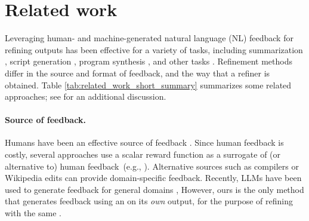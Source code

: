 \section{Related work}
Leveraging human- and machine-generated natural language (NL) feedback for refining outputs has been effective for a variety of tasks, including summarization \cite{scheurerandperez2022training}, script generation \cite{tandon2021interscript}, program synthesis \cite{Le2022CodeRL, Yasunaga2020DrRepair}, 
and other tasks \cite{bai2022rlhf, Schick2022PEERAC, Saunders2022SelfCritique, bai2022constitutional, Welleck2022SelfCorrect}. Refinement methods differ in the source and format of feedback, and the way that a refiner is obtained.
Table \ref{tab:related_work_short_summary} summarizes some related approaches; see  for an additional discussion.



 

\paragraph{Source of feedback.}

Humans have been an effective source of feedback \cite{tandon2021interscript,elgohary2021nl,tandon2022learning,bai2022rlhf}. 
Since human feedback is costly, several approaches
use a scalar reward function as a surrogate of (or alternative to) human feedback~(e.g., \cite{bai2022rlhf, Liu2022RainierRK, Lu2022QuarkCT, Le2022CodeRL, Welleck2022SelfCorrect}).
Alternative sources such as compilers 
\cite{Yasunaga2020DrRepair} or Wikipedia edits \cite{Schick2022PEERAC} can provide domain-specific feedback.
Recently, LLMs have been used to generate feedback for general domains \cite{fu2023gptscore,Peng2023LLMAugmenter,Yang2022Re3GL},
However, ours 
is the only method that generates
feedback using an \llm on its \emph{own} output, for the purpose of refining with the same \llm.


